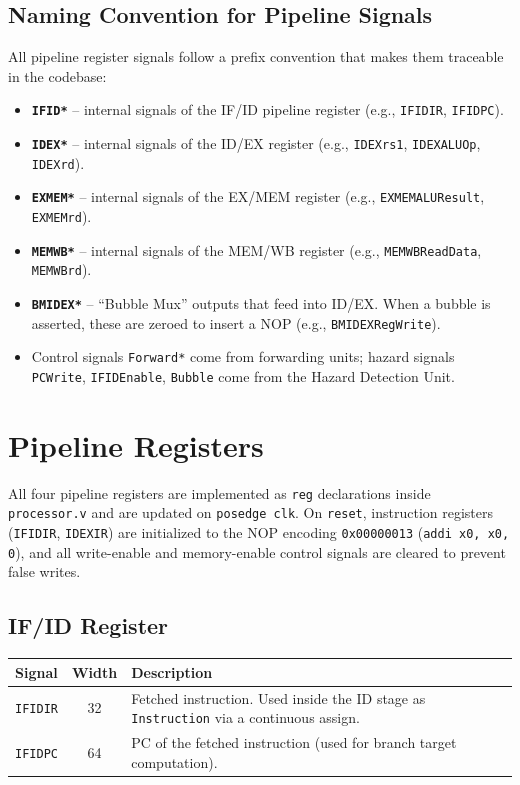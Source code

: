 \documentclass[12pt,a4paper]{article}
\begin{document}
\subsection{Naming Convention for Pipeline Signals}
All pipeline register signals follow a prefix convention that makes them traceable in the codebase:
\begin{itemize}
    \item \textbf{\texttt{IFID*}} -- internal signals of the IF/ID pipeline register (e.g., \texttt{IFIDIR}, \texttt{IFIDPC}).
    \item \textbf{\texttt{IDEX*}} -- internal signals of the ID/EX register (e.g., \texttt{IDEXrs1}, \texttt{IDEXALUOp}, \texttt{IDEXrd}).
    \item \textbf{\texttt{EXMEM*}} -- internal signals of the EX/MEM register (e.g., \texttt{EXMEMALUResult}, \texttt{EXMEMrd}).
    \item \textbf{\texttt{MEMWB*}} -- internal signals of the MEM/WB register (e.g., \texttt{MEMWBReadData}, \texttt{MEMWBrd}).
    \item \textbf{\texttt{BMIDEX*}} -- ``Bubble Mux'' outputs that feed into ID/EX. When a bubble is asserted, these are zeroed to insert a NOP (e.g., \texttt{BMIDEXRegWrite}).
    \item Control signals \texttt{Forward*} come from forwarding units; hazard signals \texttt{PCWrite}, \texttt{IFIDEnable}, \texttt{Bubble} come from the Hazard Detection Unit.
\end{itemize}

\section{Pipeline Registers}

All four pipeline registers are implemented as \texttt{reg} declarations inside \texttt{processor.v} and are updated on \texttt{posedge clk}. On \texttt{reset}, instruction registers (\texttt{IFIDIR}, \texttt{IDEXIR}) are initialized to the NOP encoding \texttt{0x00000013} (\texttt{addi x0, x0, 0}), and all write-enable and memory-enable control signals are cleared to prevent false writes.

\subsection{IF/ID Register}
\begin{center}
\begin{tabular}{lcp{7cm}}
    \toprule
    \textbf{Signal} & \textbf{Width} & \textbf{Description} \\
    \midrule
    \texttt{IFIDIR} & 32 & Fetched instruction. Used inside the ID stage as \texttt{Instruction} via a continuous assign. \\
    \texttt{IFIDPC} & 64 & PC of the fetched instruction (used for branch target computation). \\
    \bottomrule
\end{tabular}
\end{center}
\end{document}
